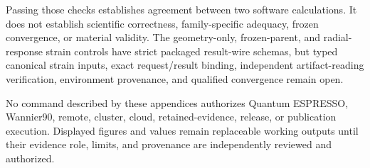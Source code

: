 Passing those checks establishes agreement between two software calculations. It does
not establish scientific correctness, family-specific adequacy, frozen convergence, or
material validity. The geometry-only, frozen-parent, and radial-response strain controls
have strict packaged result-wire schemas, but typed canonical strain inputs, exact
request/result binding, independent artifact-reading verification, environment
provenance, and qualified convergence remain open.

\begin{prospective}
No command described by these appendices authorizes Quantum ESPRESSO, Wannier90, remote,
cluster, cloud, retained-evidence, release, or publication execution. Displayed figures
and values remain replaceable working outputs until their evidence role, limits, and
provenance are independently reviewed and authorized.
\end{prospective}
